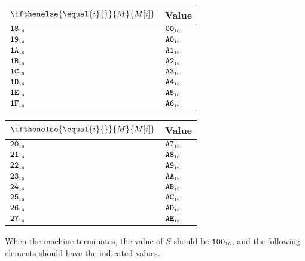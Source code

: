 \documentclass[a4paper,12pt]{article}
\newcommand{\num}[1]{\texttt{#1}}
\newcommand{\hex}[1]{\num{#1}_{\textup{\tiny 16}}}
\newcommand{\MEM}[1]{\ifthenelse{\equal{#1}{}}{M}{M[#1]}}
\newcommand{\SP}{S}
\begin{document}
\begin{center}
\begin{tabular}{@{}ll@{}}
    \hline
    $\MEM{i}$  & Value \\
    \hline
    $\hex{18}$ & $\hex{00}$ \\
    $\hex{19}$ & $\hex{A0}$ \\
    $\hex{1A}$ & $\hex{A1}$ \\
    $\hex{1B}$ & $\hex{A2}$ \\
    $\hex{1C}$ & $\hex{A3}$ \\
    $\hex{1D}$ & $\hex{A4}$ \\
    $\hex{1E}$ & $\hex{A5}$ \\
    $\hex{1F}$ & $\hex{A6}$ \\
    \hline
  \end{tabular}
  \hfil
  \begin{tabular}{@{}ll@{}}
    \hline
    $\MEM{i}$  & Value \\
    \hline
    $\hex{20}$ & $\hex{A7}$ \\
    $\hex{21}$ & $\hex{A8}$ \\
    $\hex{22}$ & $\hex{A9}$ \\
    $\hex{23}$ & $\hex{AA}$ \\
    $\hex{24}$ & $\hex{AB}$ \\
    $\hex{25}$ & $\hex{AC}$ \\
    $\hex{26}$ & $\hex{AD}$ \\
    $\hex{27}$ & $\hex{AE}$ \\
    \hline
  \end{tabular}
\end{center}

When the machine terminates, the value of $\SP$ should be $\hex{100}$, and the following elements should have the indicated values.
\end{document}
